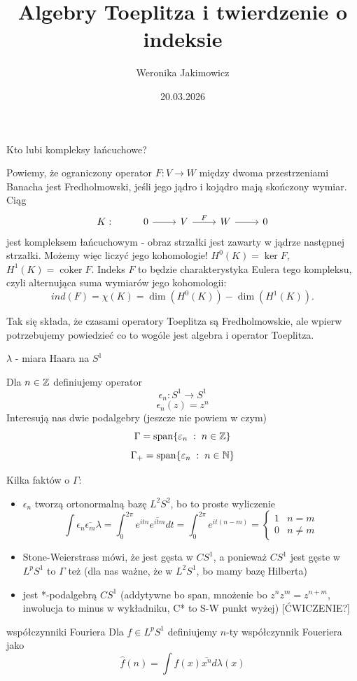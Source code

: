 \documentclass[12pt]{book}
\title{Algebry Toeplitza i twierdzenie o indeksie}
\author{Weronika Jakimowicz}
\date{20.03.2026}
\DeclareMathOperator{\coker}{coker}
\DeclareMathOperator{\myspan}{span}
\renewcommand{\span}{\myspan}
\begin{document}

Kto lubi kompleksy łańcuchowe?

Powiemy, że ograniczony operator $F:V\to W$ między dwoma przestrzeniami Banacha jest Fredholmowski, jeśli jego jądro i kojądro mają skończony wymiar. Ciąg
$$\begin{tikzcd}
  K:&0\arrow[r] & V\arrow[r, "F" above] & W\arrow[r] & 0
\end{tikzcd}$$
jest kompleksem łańcuchowym - obraz strzałki jest zawarty w jądrze następnej strzałki. Możemy więc liczyć jego kohomologie! $H^0(K)=\ker F$, $H^1(K)=\coker F$. Indeks $F$ to będzie charakterystyka Eulera tego kompleksu, czyli alternująca suma wymiarów jego kohomologii:
$$ind(F)=\chi(K)=\dim(H^0(K))-\dim(H^1(K)).$$

Tak się składa, że czasami operatory Toeplitza są Fredholmowskie, ale wpierw potrzebujemy powiedzieć co to wogóle jest algebra i operator Toeplitza.

$\lambda$ - miara Haara na $S^1$

Dla $n\in\mathbb{Z}$ definiujemy operator
$$\epsilon_n: S^1\to S^1$$
$$\epsilon_n(z)=z^n$$
Interesują nas dwie podalgebry (jeszcze nie powiem w czym)
$$\Gamma=\span\{\epsilon_n\;:\;n\in\Z\}$$
$$\Gamma_+=\span\{\epsilon_n\;:\;n\in\N\}$$

Kilka faktów o $\Gamma$:
\begin{itemize}
  \item $\epsilon_n$ tworzą ortonormalną bazę $L^2S^2$, bo to proste wyliczenie
    $$\int\epsilon_n\overline{\epsilon_m}\lambda= \int_0^{2\pi} e^{itn}\overline{e^{itm}}dt=\int_0^{2\pi}e^{it(n-m)}=\begin{cases}1 & n=m\\0&n\neq m\end{cases}$$
  \item Stone-Weierstrass mówi, że jest gęsta w $CS^1$, a ponieważ $CS^1$ jest gęste w $L^pS^1$ to $\Gamma$ też (dla nas ważne, że w $L^2S^1$, bo mamy bazę Hilberta)
  \item jest *-podalgebrą $CS^1$ (addytywne bo span, mnożenie bo $z^nz^m=z^{n+m}$, inwolucja to minus w wykładniku, C* to S-W punkt wyżej) [{\color{red}ĆWICZENIE?}]
\end{itemize}

\begin{definition}{współczynniki Fouriera}{}
  Dla $f\in L^pS^1$ definiujemy $n$-ty współczynnik Foueriera jako
  $$\hat{f}(n)=\int f(x)\overline{x^n}d\lambda(x)$$
\end{definition}
\end{document}
